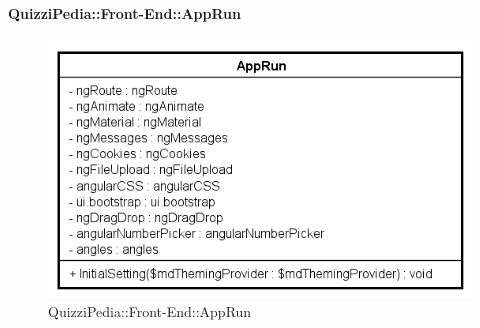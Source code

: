	\paragraph{QuizziPedia::Front-End::AppRun}
		
		\label{QuizziPedia::Front-End::AppRun}
		
		\begin{figure}[ht]
			\centering
			\includegraphics[scale=0.45,keepaspectratio]{UML/Classi/Front-End/QuizziPedia_Front-end_AppRun.png}
			\caption{QuizziPedia::Front-End::AppRun}
		\end{figure} \FloatBarrier
		
